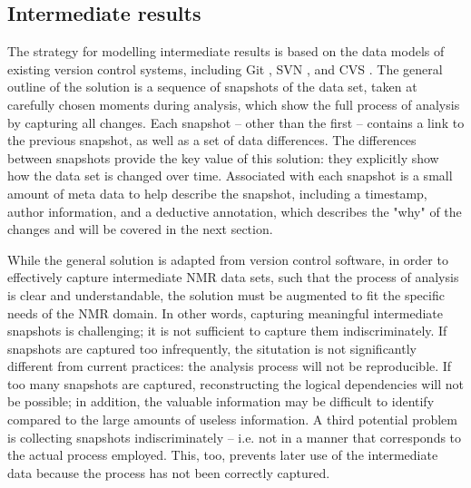\subsection{Intermediate results}
The strategy for modelling intermediate results is based on the data models
of existing version control systems, including Git \cite{loeliger2012git},
SVN \cite{svn}, and CVS \cite{cvs}.  The general outline of the solution 
is a sequence of snapshots of the data set, taken at carefully chosen 
moments during analysis, which show the full process of analysis by capturing
all changes.  Each snapshot -- other than the first -- contains a link to
the previous snapshot, as well as a set of data differences.  The differences
between snapshots provide the key value of this solution: they explicitly
show how the data set is changed over time.
Associated with each snapshot is a small amount of meta data to help describe
the snapshot, including a timestamp, author information, and a deductive
annotation, which describes the "why" of the changes and will be covered in
the next section.

While the general solution is adapted from version control software, in order
to effectively capture intermediate NMR data sets, such that the process of
analysis is clear and understandable, the solution must be augmented to fit
the specific needs of the NMR domain.
In other words, capturing meaningful intermediate snapshots is challenging; it 
is not sufficient to capture them indiscriminately.  If snapshots are captured 
too infrequently, the situtation is not significantly different from current 
practices: the analysis process will not be reproducible.  If too many snapshots
are captured, reconstructing the logical dependencies will not be possible;
in addition, the valuable information may be difficult to identify compared to
the large amounts of useless information.  A third potential problem is 
collecting snapshots indiscriminately -- i.e. not in a manner that corresponds
to the actual process employed.  This, too, prevents later use of the 
intermediate data because the process has not been correctly captured.

